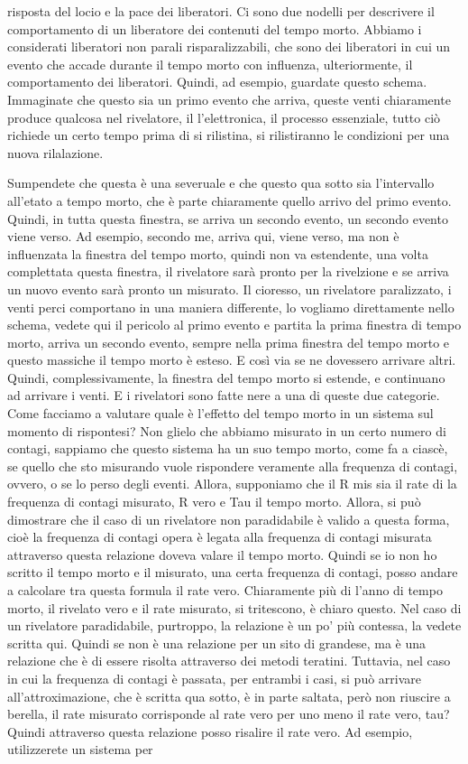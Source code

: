 risposta del locio e la pace dei liberatori. Ci sono due nodelli per descrivere il comportamento di un liberatore dei contenuti del tempo morto. Abbiamo i considerati liberatori non parali risparalizzabili, che sono dei liberatori in cui un evento che accade durante il tempo morto con influenza, ulteriormente, il comportamento dei liberatori. Quindi, ad esempio, guardate questo schema. Immaginate che questo sia un primo evento che arriva, queste venti chiaramente produce qualcosa nel rivelatore, il l'elettronica, il processo essenziale, tutto ciò richiede un certo tempo prima di si rilistina, si rilistiranno le condizioni per una nuova rilalazione. 

Sumpendete che questa è una severuale e che questo qua sotto sia l'intervallo all'etato a tempo morto, che è parte chiaramente quello arrivo del primo evento. Quindi, in tutta questa finestra, se arriva un secondo evento, un secondo evento viene verso. Ad esempio, secondo me, arriva qui, viene verso, ma non è influenzata la finestra del tempo morto, quindi non va estendente, una volta complettata questa finestra, il rivelatore sarà pronto per la rivelzione e se arriva un nuovo evento sarà pronto un misurato. Il cioresso, un rivelatore paralizzato, i venti perci comportano in una maniera differente, lo vogliamo direttamente nello schema, vedete qui il pericolo al primo evento e partita la prima finestra di tempo morto, arriva un secondo evento, sempre nella prima finestra del tempo morto e questo massiche il tempo morto è esteso. E così via se ne dovessero arrivare altri. Quindi, complessivamente, la finestra del tempo morto si estende, e continuano ad arrivare i venti. E i rivelatori sono fatte nere a una di queste due categorie. Come facciamo a valutare quale è l'effetto del tempo morto in un sistema sul momento di rispontesi? Non glielo che abbiamo misurato in un certo numero di contagi, sappiamo che questo sistema ha un suo tempo morto, come fa a ciascè, se quello che sto misurando vuole rispondere veramente alla frequenza di contagi, ovvero, o se lo perso degli eventi. Allora, supponiamo che il R mis sia il rate di la frequenza di contagi misurato, R vero e Tau il tempo morto. Allora, si può dimostrare che il caso di un rivelatore non paradidabile è valido a questa forma, cioè la frequenza di contagi opera è legata alla frequenza di contagi misurata attraverso questa relazione doveva valare il tempo morto. Quindi se io non ho scritto il tempo morto e il misurato, una certa frequenza di contagi, posso andare a calcolare tra questa formula il rate vero. Chiaramente più di l'anno di tempo morto, il rivelato vero e il rate misurato, si tritescono, è chiaro questo. Nel caso di un rivelatore paradidabile, purtroppo, la relazione è un po' più contessa, la vedete scritta qui. Quindi se non è una relazione per un sito di grandese, ma è una relazione che è di essere risolta attraverso dei metodi teratini. Tuttavia, nel caso in cui la frequenza di contagi è passata, per entrambi i casi, si può arrivare all'attroximazione, che è scritta qua sotto, è in parte saltata, però non riuscire a berella, il rate misurato corrisponde al rate vero per uno meno il rate vero, tau? Quindi attraverso questa relazione posso risalire il rate vero. Ad esempio, utilizzerete un sistema per 